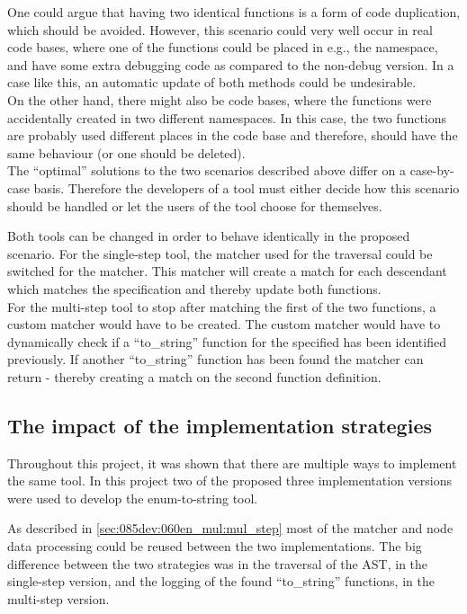 One could argue that having two identical functions is a form of code duplication, which should be avoided. 
However, this scenario could very well occur in real code bases, where one of the functions could be placed in e.g., the  namespace, and have some extra debugging code as compared to the non-debug version. In a case like this, an automatic update of both methods could be undesirable. \\
On the other hand, there might also be code bases, where the functions were accidentally created in two different namespaces. In this case, the two functions are probably used different places in the code base and therefore, should have the same behaviour (or one should be deleted).\\
The ``optimal'' solutions to the two scenarios described above differ on a case-by-case basis. Therefore the developers of a tool must either decide how this scenario should be handled or let the users of the tool choose for themselves.

Both tools can be changed in order to behave identically in the proposed scenario. For the single-step tool, the  matcher used for the traversal could be switched for the  matcher. This matcher will create a match for each descendant which matches the specification and thereby update both functions.\\
For the multi-step tool to stop after matching the first of the two functions, a custom matcher would have to be created. The custom matcher would have to dynamically check if a ``to\_string'' function for the specified  has been identified previously. If another ``to\_string'' function has been found the matcher can return  - thereby creating a match on the second function definition.


\subsection{The impact of the implementation strategies}

Throughout this project, it was shown that there are multiple ways to implement the same tool. In this project two of the proposed three implementation versions were used to develop the enum-to-string tool. 

As described in \cref{sec:085dev:060en_mul:mul_step} most of the matcher and node data processing could be reused between the two implementations. The big difference between the two strategies was in the traversal of the AST, in the single-step version, and the logging of the found ``to\_string'' functions, in the multi-step version.

